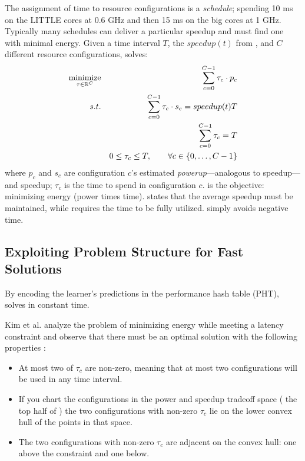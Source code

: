 The assignment of time to resource configurations is a
\emph{schedule}; \eg{} spending 10 ms on the LITTLE cores at 0.6 GHz
and then 15 ms on the big cores at 1 GHz. Typically many schedules can
deliver a particular speedup and \SYSTEM{} must find one with minimal
energy.  Given a time interval $T$, the $speedup(t)$ from
, and $C$ different resource configurations,
\SYSTEM{} solves:
\begin{eqnarray}
  \minimize_{\mathbf{\tau} \in \R^{C}} && \sum_{c=0}^{C-1} \tau_c \cdot p_c \label{eqn:power}  \\
  \st %
  && \sum_{c=0}^{C-1} \tau_c \cdot s_c =  speedup(t)T \label{eqn:work} \\
  && \sum_{c=0}^{C-1} \tau_c =  T \label{eqn:deadline} \\
  && 0 \le \tau_c \le T, \qquad \forall c \in \{0,\ldots,C-1\} \label{eqn:time}
\end{eqnarray}
where $p_c$ and $s_c$ are configuration $c$'s estimated
\emph{powerup}---analogous to speedup---and speedup; $\tau_c$ is the
time to spend in configuration $c$.   is the objective:
minimizing energy (power times time).   states that the
average speedup must be maintained, while  requires
the time to be fully utilized.   simply avoids negative
time.

\subsection{Exploiting Problem Structure for Fast Solutions}
By encoding the learner's predictions in the performance hash table
(PHT), \SYSTEM{} solves  in constant time.

Kim et al. analyze the problem of minimizing energy while meeting a
latency constraint and observe that there must be an optimal
solution with the following properties \cite{kim-cpsna}:
\begin{itemize}[leftmargin=1em]
\item At most two of $\tau_c$ are non-zero, meaning that at most two
  configurations will be used in any time interval.
\item If you chart the configurations in the power and speedup
  tradeoff space (\eg{} the top half of ) the two
  configurations with non-zero $\tau_c$ lie on the lower convex hull
  of the points in that space.
\item The two configurations with non-zero $\tau_c$ are adjacent on
  the convex hull: one above the constraint and one below.
\end{itemize}

